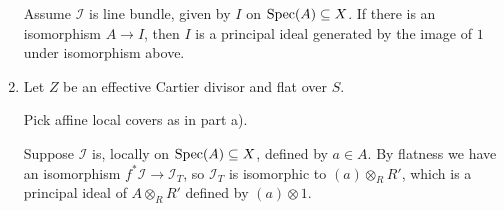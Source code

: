 \begin{exercise}{2}
\begin{enumerate}
{                Assume $\mathcal{I}$ is line bundle, given by $I$ on $\operatorname{Spec}(A)
                \subseteq X$. If there is an isomorphism $A \to I$, then $I$ is
                a principal ideal generated by the image of $1$ under
                isomorphism above.
            }
        \item{
                Let $Z$ be an effective Cartier divisor and flat over $S$.

                Pick affine local covers as in part a).

                Suppose $\mathcal{I}$ is, locally on $\operatorname{Spec}(A) \subseteq X$,
                defined by $a \in A$. By flatness we have an isomorphism $f^*
                \mathcal{I} \to \mathcal{I}_T$, so $\mathcal{I}_T$ is isomorphic
                to $(a) \otimes_R R'$, which is a principal ideal of $A
                \otimes_R R'$ defined by $(a) \otimes 1$.
            }
    \end{enumerate}
\end{exercise}



